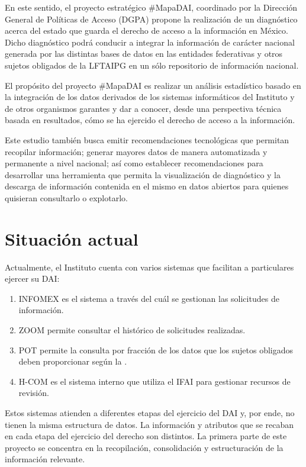 En este sentido, el proyecto estratégico \#MapaDAI, coordinado por la Dirección General de Políticas de Acceso (DGPA) propone la realización de un diagnóstico acerca del estado que guarda el derecho de acceso a la información en México. Dicho diagnóstico podrá conducir a integrar la información de carácter nacional generada por las distintas bases de datos en las entidades federativas y otros sujetos obligados de la LFTAIPG en un sólo repositorio de información nacional.

El propósito del proyecto \#MapaDAI es realizar un análisis estadístico basado en la integración de los datos derivados de los sistemas informáticos del Instituto y de otros organismos garantes y dar a conocer, desde una perspectiva técnica basada en resultados, cómo se ha ejercido el derecho de acceso a la información. 

Este estudio también busca emitir recomendaciones tecnológicas que permitan recopilar información; generar mayores datos de manera automatizada y permanente a nivel nacional; así como establecer recomendaciones para desarrollar una herramienta que permita la visualización de diagnóstico y la descarga de información contenida en el mismo en datos abiertos para quienes quisieran consultarlo o explotarlo.

\section{Situación actual}

Actualmente, el Instituto cuenta con varios sistemas que facilitan a particulares ejercer su DAI: 

\begin{enumerate}
\item INFOMEX es el sistema a través del cuál se gestionan las solicitudes de información.
\item ZOOM permite consultar el histórico de solicitudes realizadas.
\item POT permite la consulta por fracción de los datos que los sujetos obligados deben proporcionar según la \textcite{lft}.
\item H-COM es el sistema interno que utiliza el IFAI para gestionar recursos de revisión.
\end{enumerate}

Estos sistemas atienden a diferentes etapas del ejercicio del DAI y, por ende, no tienen la misma estructura de datos. La información y atributos que se recaban en cada etapa del ejercicio del derecho son distintos. La primera parte de este proyecto se concentra en la recopilación, consolidación y estructuración de la información relevante.

